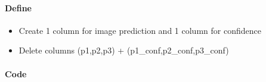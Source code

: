 \documentclass[11pt]{article}
\providecommand{\tightlist}{%
      \setlength{\itemsep}{0pt}\setlength{\parskip}{0pt}}
\begin{document}
    \hypertarget{define}{%
\paragraph{Define}\label{define}}

\begin{itemize}
\tightlist
\item
  Create 1 column for image prediction and 1 column for confidence
\item
  Delete columns (p1,p2,p3) + (p1\_conf,p2\_conf,p3\_conf)
\end{itemize}

    \hypertarget{code}{%
\paragraph{Code}\label{code}}
\end{document}
